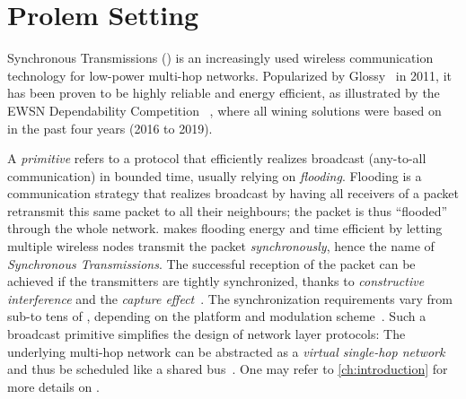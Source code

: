 
\section{Prolem Setting}
\label{sec:baloo_intro}

Synchronous Transmissions (\ST) is an increasingly used wireless communication technology for low-power multi-hop networks. Popularized by Glossy~\cite{ferrari2011Glossy} in 2011, it has been proven to be highly reliable and energy efficient, as illustrated by the EWSN Dependability Competition ~\cite{schuss2017Competition}, where all wining solutions were based on \ST~\cite{escobar2018Competition,sommer2016Competition,lim2017Competition, escobar2019RedNodeBus, ma2019DeCoT} in the past four years (2016 to 2019).

A \textsl{\ST primitive} refers to a protocol that efficiently realizes broadcast (\ie any-to-all communication) in bounded time, usually relying on \textsl{flooding}.
Flooding is a communication strategy that realizes broadcast by having all receivers of a packet retransmit this same packet to all their neighbours; the packet is thus ``flooded'' through the whole network. \ST makes flooding energy and time efficient by letting multiple wireless nodes transmit the packet \textsl{synchronously}, hence the name of \textsl{Synchronous Transmissions}. The successful reception of the packet can be achieved if the transmitters are tightly synchronized, thanks to \textsl{constructive interference} and the \textsl{capture effect}~\cite{yuan2013LetTalkTogether}.
The synchronization requirements vary from sub-\us to tens of \us, depending on the platform and modulation scheme~\cite{yuan2013LetTalkTogether}.
Such a broadcast primitive simplifies the design of network layer protocols: The underlying multi-hop network can be abstracted as a \textsl{virtual single-hop network} and thus be scheduled like a shared bus~\cite{ferrari2012LWB}.
One may refer to \cref{ch:introduction} for more details on \ST.

